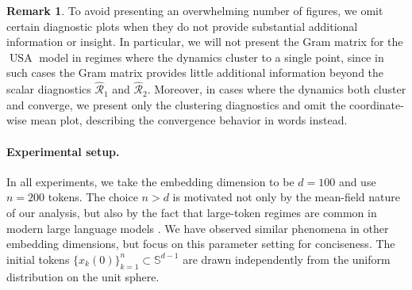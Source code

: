\documentclass[10pt]{article}
\theoremstyle{definition}
\theoremstyle{definition}
\newtheorem{remark}[theorem]{Remark}
\numberwithin{equation}{section}
\newcommand{\CR}{\mathcal{R}}
\begin{document}
\begin{remark}
To avoid presenting an overwhelming number of figures, we omit certain diagnostic plots when they do not provide substantial additional information or insight.
In particular, we will not present the Gram matrix for the $\operatorname{USA}$ model in regimes where the dynamics cluster to a single point, since in such cases the Gram matrix provides little additional information beyond the scalar diagnostics $\widehat{\CR}_1$ and $\widehat{\CR}_2$.
Moreover, in cases where the dynamics both cluster and converge, we present only the clustering diagnostics and omit the coordinate-wise mean plot, describing the convergence behavior in words instead.
\end{remark}

\paragraph{Experimental setup.}
In all experiments, we take the embedding dimension to be $d=100$ and use $n=200$ tokens. 
The choice $n > d$ is motivated not only by the mean-field nature of our analysis, but also by the fact that large-token regimes are common in modern large language models \cite{gpt,gemini2023,llama,liu2024deepseek}. 
We have observed similar phenomena in other embedding dimensions, but focus on this parameter setting for conciseness.
The initial tokens $\{x_k(0)\}_{k=1}^n \subset \mathbb{S}^{d-1}$
are drawn independently from the uniform distribution on the unit sphere. 

\end{document}
